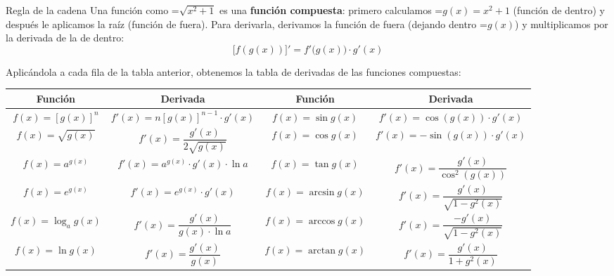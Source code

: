 \documentclass[11pt,a4paper]{article}
\newcommand{\fmm}[1]{\setbox0=\hbox{$#1$}\ifdim\wd0>\linewidth\[#1\]\else\mbox{\box0}\fi}
\begin{document}
  
\begin{fmdef}{Regla de la cadena}
Una función como \fmm{\sqrt{x^2+1}} es una \textbf{función compuesta}: primero calculamos \fmm{g(x)=x^2+1} (función de dentro) y después le aplicamos la raíz (función de fuera). Para derivarla, derivamos la función de fuera (dejando dentro \fmm{g(x)}) y multiplicamos por la derivada de la de dentro:    
\[\big[f(g(x))\big]'=f'\big(g(x)\big)\cdot g'(x)\]

    

Aplicándola a cada fila de la tabla anterior, obtenemos la tabla de derivadas de las funciones compuestas:

      
\begin{center}\renewcommand{\arraystretch}{1.5}\begin{tabular}{cccc}\toprule
\textbf{Función} & \textbf{Derivada} & \textbf{Función} & \textbf{Derivada}\\\midrule
$f(x)=[g(x)]^n$ & $f'(x)=n[g(x)]^{n-1}\cdot g'(x)$ & $f(x)=\sin g(x)$ & $f'(x)=\cos(g(x))\cdot g'(x)$\\
$f(x)=\sqrt{g(x)}$ & $f'(x)=\dfrac{g'(x)}{2\sqrt{g(x)}}$ & $f(x)=\cos g(x)$ & $f'(x)=-\sin(g(x))\cdot g'(x)$\\
$f(x)=a^{g(x)}$ & $f'(x)=a^{g(x)}\cdot g'(x)\cdot\ln a$ & $f(x)=\tan g(x)$ & $f'(x)=\dfrac{g'(x)}{\cos^2(g(x))}$\\[1ex]
$f(x)=e^{g(x)}$ & $f'(x)=e^{g(x)}\cdot g'(x)$ & $f(x)=\arcsin g(x)$ & $f'(x)=\dfrac{g'(x)}{\sqrt{1-g^2(x)}}$\\[1ex]
$f(x)=\log_a g(x)$ & $f'(x)=\dfrac{g'(x)}{g(x)\cdot\ln a}$ & $f(x)=\arccos g(x)$ & $f'(x)=\dfrac{-g'(x)}{\sqrt{1-g^2(x)}}$\\[1ex]
$f(x)=\ln g(x)$ & $f'(x)=\dfrac{g'(x)}{g(x)}$ & $f(x)=\arctan g(x)$ & $f'(x)=\dfrac{g'(x)}{1+g^2(x)}$\\[1ex]
\bottomrule\end{tabular}\end{center}
\end{fmdef}
\end{document}
